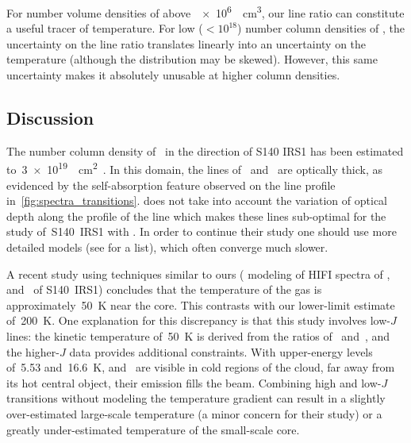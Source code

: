 For number volume densities of  above~\SI{e6}{\per\centi\meter\cubed}, our line ratio can constitute a useful tracer of temperature.
For low ($<10^{18}$) number column densities of , the uncertainty on the line ratio translates linearly into an uncertainty on the temperature (although the distribution may be skewed).
However, this same uncertainty makes it absolutely unusable at higher column densities.



\FloatBarrier
\subsection{Discussion}

The number column density of~ in the direction of S140 IRS1 has been estimated to~\SI{3e19}{\per\centi\meter\squared}~\parencite{poelman2006line,koumpia2015}.
In this domain, the lines of~ and~ are optically thick, as evidenced by the self-absorption feature observed on the line profile in~\cref{fig:spectra_transitions}.
\Radex{} does not take into account the variation of optical depth along the profile of the line \parencite{langevelde2004} which makes these lines sub-optimal for the study of~S140~IRS1 with \radex{}.
In order to continue their study one should use more detailed models (see \cite{zadelhoff2002} for a list), which often converge much slower.

A recent study \parencite{koumpia2015} using techniques similar to ours (\radex{} modeling of HIFI spectra of ,  and~ of S140~IRS1) concludes that the temperature of the gas is approximately~\SI{50}{\kelvin} near the core.
This contrasts with our lower-limit estimate of~\SI{200}{\kelvin}.
One explanation for this discrepancy is that this study involves low-$J$  lines: the kinetic temperature of~\SI{50}{\kelvin} is derived from the ratios of~ and~, and the higher-$J$ data provides additional constraints.
With upper-energy levels of~\num{5.53} and~\SI{16.6}{\kelvin},  and~ are visible in cold regions of the cloud, far away from its hot central object, their emission fills the beam.
Combining high and low-$J$ transitions without modeling the temperature gradient can result in a slightly over-estimated large-scale temperature (a minor concern for their study) or a greatly under-estimated temperature of the small-scale core.

